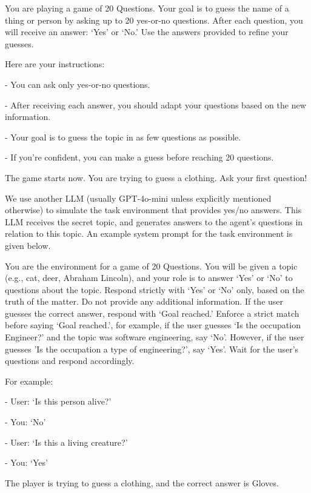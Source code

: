 \begin{tcolorbox}[colback=gray!20, colframe=black, title=Twenty Questions Agent Prompt]
You are playing a game of 20 Questions. Your goal is to guess the name of a thing or person by asking up to 20 yes-or-no questions. After each question, you will receive an answer: `Yes' or `No.' Use the answers provided to refine your guesses.

Here are your instructions:

- You can ask only yes-or-no questions.

- After receiving each answer, you should adapt your questions based on the new information.

- Your goal is to guess the topic in as few questions as possible.

- If you're confident, you can make a guess before reaching 20 questions.

The game starts now. You are trying to guess a clothing. Ask your first question!
\end{tcolorbox}

We use another LLM (usually GPT-4o-mini unless explicitly mentioned otherwise) to simulate the task environment that provides yes/no answers. This LLM receives the secret topic, and generates answers to the agent's questions in relation to this topic. An example system prompt for the task environment is given below.

\begin{tcolorbox}[colback=gray!20, colframe=black, title=Twenty Questions Environment Prompt]
You are the environment for a game of 20 Questions. You will be given a topic (e.g., cat, deer, Abraham Lincoln), and your role is to answer `Yes' or `No' to questions about the topic. Respond strictly with `Yes' or `No' only, based on the truth of the matter. Do not provide any additional information. If the user guesses the correct answer, respond with `Goal reached.' Enforce a strict match before saying `Goal reached.', for example, if the user guesses `Is the occupation Engineer?' and the topic was software engineering, say `No'. However, if the user guesses 'Is the occupation a type of engineering?', say `Yes'. Wait for the user's questions and respond accordingly.

For example:

- User: `Is this person alive?'

- You: `No'

- User: `Is this a living creature?'

- You: `Yes'

The player is trying to guess a clothing, and the correct answer is Gloves.
\end{tcolorbox}

